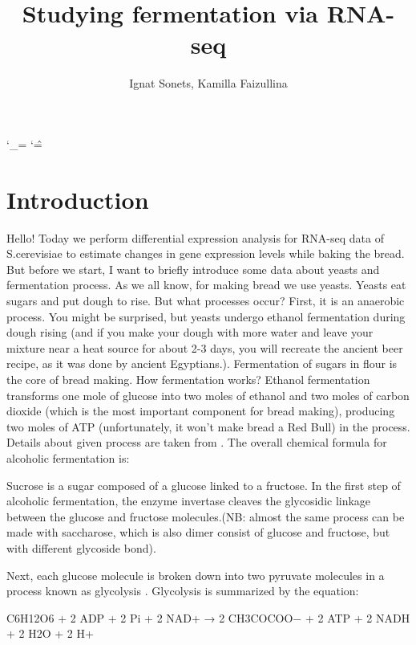 \documentclass{article}
\title{Studying  fermentation via RNA-seq  }
\author{ Ignat Sonets, Kamilla Faizullina}
\date{\empty}
\begin{document}
	
		\catcode`\_=\active
	\catcode`\^=\active
	
\maketitle
 
 
\section{Introduction}
 
 Hello! Today we perform differential expression analysis for RNA-seq data of S.cerevisiae to estimate changes in gene expression levels while baking the bread. But before we start, I want to briefly introduce some data about yeasts and fermentation process.
 As we all  know, for making bread we use yeasts. Yeasts eat sugars and put dough to rise. But what processes occur? First, it is an anaerobic process. You might be surprised, but yeasts undergo ethanol fermentation during dough rising (and if you make your dough with more water and leave your mixture near a heat source for about 2-3 days, you will recreate the ancient beer recipe, as it was done by ancient Egyptians.). Fermentation of sugars in flour is the core of bread making. How fermentation works? Ethanol fermentation transforms one mole of glucose into two moles of ethanol and two moles of carbon dioxide (which is the most important component for bread making), producing two moles of ATP (unfortunately, it won't make bread a Red Bull) in the process. 
 Details about given process are taken from \cite{1}.
 The overall chemical formula for alcoholic fermentation is:
 
 
 Sucrose is a sugar composed of a glucose linked to a fructose. In the first step of alcoholic fermentation, the enzyme invertase cleaves the glycosidic linkage between the glucose and fructose molecules.(NB: almost the same process can be made with saccharose, which is also dimer consist of glucose and fructose, but with different glycoside bond).
 
 
 Next, each glucose molecule is broken down into two pyruvate molecules in a process known as glycolysis \cite{2}. Glycolysis is summarized by the equation:
 
 C6H12O6 + 2 ADP + 2 Pi + 2 NAD+ → 2 CH3COCOO− + 2 ATP + 2 NADH \\
 + 2 H2O + 2 H+
 
\end{document}

